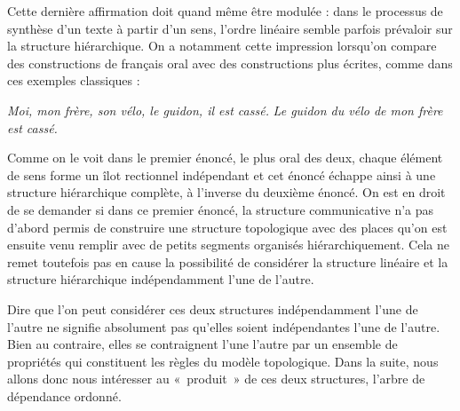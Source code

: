 {    Cette dernière affirmation doit quand même être modulée : dans le processus de synthèse d’un texte à partir d’un sens, l’ordre linéaire semble parfois prévaloir sur la structure hiérarchique. On a notamment cette impression lorsqu’on compare des constructions de français oral avec des constructions plus écrites, comme dans ces exemples classiques :

    \ea
    \ea  \textit{Moi, mon frère, son vélo, le guidon, il est cassé.}
    \ex  \textit{Le guidon du vélo de mon frère est cassé.}
    \z
    \z

    Comme on le voit dans le premier énoncé, le plus oral des deux, chaque élément de sens forme un îlot rectionnel indépendant et cet énoncé échappe ainsi à une structure hiérarchique complète, à l’inverse du deuxième énoncé. On est en droit de se demander si dans ce premier énoncé, la structure communicative n’a pas d’abord permis de construire une structure topologique avec des places qu’on est ensuite venu remplir avec de petits segments organisés hiérarchiquement. Cela ne remet toutefois pas en cause la possibilité de considérer la structure linéaire et la structure hiérarchique indépendamment l’une de l’autre.

    Dire que l’on peut considérer ces deux structures indépendamment l’une de l’autre ne signifie absolument pas qu’elles soient indépendantes l’une de l’autre. Bien au contraire, elles se contraignent l’une l’autre par un ensemble de propriétés qui constituent les règles du modèle topologique. Dans la suite, nous allons donc nous intéresser au «~produit~» de ces deux structures, l’arbre de dépendance ordonné.
}
